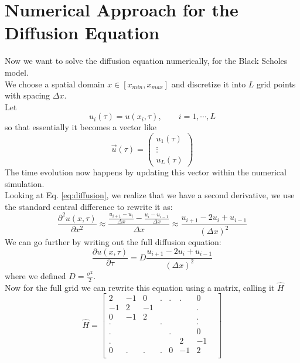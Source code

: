 \documentclass[11pt]{article}
\begin{document}
\section{Numerical Approach for the Diffusion Equation}
Now we want to solve the diffusion equation numerically, for the Black Scholes model. \\
We choose a spatial domain $x \in \left[x_{min}, x_{max} \right]$ and discretize it into $L$ grid points with spacing $\Delta x$.\\
Let
\begin{equation}
    u_i(\tau) = u(x_i, \tau), \qquad i=1,\cdots,L
    \label{eq:uapprox}
\end{equation}
so that essentially it becomes a vector like
\begin{equation} \vec{u}(\tau) =
    \begin{pmatrix}
        u_1(\tau)\\
        \vdots\\
        u_L(\tau)
    \end{pmatrix}
    \label{eq:uvector}
\end{equation}
The time evolution now happens by updating this vector within the numerical simulation.\\
Looking at Eq. \ref{eq:diffusion}, we realize that we have a second derivative, we use the standard central difference to rewrite it as:
\begin{equation}
    \frac{\partial ^2 u(x, \tau)}{\partial x^2} \approx \frac{\frac{u_{i+1} - u_i}{\Delta x} - \frac{u_{i} - u_{i-1}}{\Delta x}}{\Delta x} \approx \frac{u_{i+1} - 2u_i + u_{i-1}}{(\Delta x)^2}
    \label{eq:numeric1}
\end{equation}
We can go further by writing out the full diffusion equation:
\begin{equation}
    \frac{\partial u(x,\tau)}{\partial \tau} = D  \frac{u_{i+1} - 2u_i + u_{i-1}}{(\Delta x)^2}
\end{equation}
where we defined $D=\frac{\sigma^2}{2}$.\\
Now for the full grid we can rewrite this equation using a matrix, calling it $\hat{H}$
\begin{equation}
\hat{H}=
\begin{bmatrix}
    2 & -1 & 0 & . & . & . &  0 &  \\
    -1 & 2 & -1 &   &   &   &  . &   \\
    0 & -1 & 2 &   &   &   &  . &   \\
    . &   &    & . &   &   &  . &   \\
    . &   &    &   & . &   &  0 &   \\
    . &   &    &   &   & 2 &  -1 &   \\
    0 & . &  . & . & 0 & -1 & 2 &   \\
\end{bmatrix}
\label{D-matrix}
\end{equation}
\end{document}
